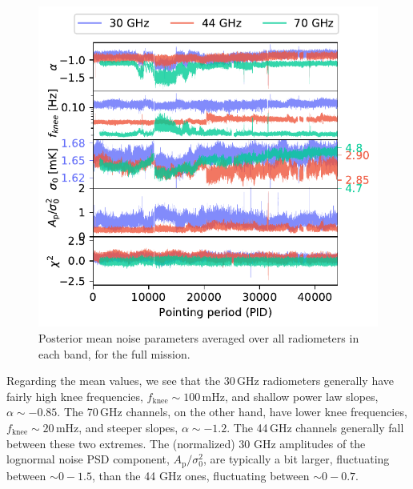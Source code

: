 \documentclass{aa}
\begin{document}
\begin{figure}
        \begin{center}
                \includegraphics[width=1.04\linewidth]{figs/xi_vs_pid_mean_new.pdf}
        \end{center}
        \caption{Posterior mean noise parameters averaged over all radiometers in each band, for the full mission.
                \label{fig:xi_vs_pid_mean}}
\end{figure}

Regarding the mean values, we see that the 30\,GHz radiometers generally
have fairly high knee frequencies,
$f_\mathrm{knee}\sim100\,\textrm{mHz}$, and shallow power law slopes,
$\alpha\sim-0.85$. The 70\,GHz channels, on the other hand, have lower
knee frequencies, $f_\mathrm{knee}\sim20\,\textrm{mHz}$, and steeper
slopes, $\alpha\sim-1.2$. The 44\,GHz channels generally
fall between these two extremes. The (normalized) 30 GHz amplitudes of the 
lognormal noise PSD component, $A_\mathrm{p} / \sigma_0^2$, are 
typically a bit larger, fluctuating between $\sim 0-1.5$, than the 44 GHz ones, 
fluctuating between $\sim 0-0.7$. 
\end{document}
